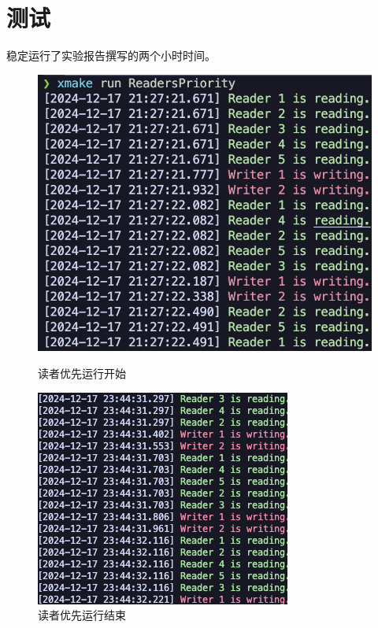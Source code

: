 \section{测试}

稳定运行了实验报告撰写的两个小时时间。

\begin{figure}[H]
    \centering
    \begin{minipage}[t]{0.4\textwidth}
        \centering
        \includegraphics[width=\textwidth]{images/reader_start.png}
        \caption{读者优先运行开始}
    \end{minipage}
    \begin{minipage}[t]{0.4\textwidth}
        \centering
        \includegraphics[width=\textwidth]{images/reader_end.png}
        \caption{读者优先运行结束}
    \end{minipage}
\end{figure}

